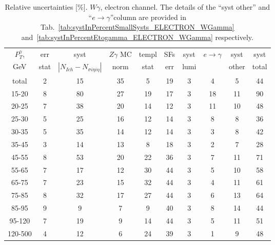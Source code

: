 \begin{table}[h]
  \scriptsize
  \begin{center}
  \caption{Relative uncertainties [\%]. $W\gamma$, electron channel. The details of the ``syst other'' and ``$e\rightarrow\gamma$''column are provided in Tab.~\ref{tab:systInPercentSmallSysts_ELECTRON_WGamma} and~\ref{tab:systInPercentEtogamma_ELECTRON_WGamma} respectively. }
   \begin{tabular}{|c|c|c|c|c|c|c|c|c|c|}
    $P_T^{\gamma}$,  & err & syst & $Z\gamma$ MC & templ & SFs & syst & $e\rightarrow\gamma$ & syst & syst\\
    GeV  & stat & $|N_{Ich}-N_{\sigma{i\eta i\eta}}|$ & norm & stat & err & lumi &  & other & total\\ \hline
    total  & 2 & 15 & 35 & 5 & 19 & 3 & 4 & 5 & 44 \\ \hline
    15-20 & 8 & 80 & 27 & 19 & 17 & 3 & 18 & 11 & 90 \\ \hline
    20-25 & 7 & 38 & 20 & 14 & 12 & 3 & 11 & 10 & 48 \\ \hline
    25-30 & 5 & 25 & 16 & 12 & 14 & 3 & 8 & 8 & 36 \\ \hline
    30-35 & 5 & 35 & 14 & 12 & 14 & 3 & 3 & 8 & 42 \\ \hline
    35-45 & 3 & 14 & 13 & 8 & 18 & 3 & 2 & 7 & 28 \\ \hline
    45-55 & 8 & 53 & 20 & 22 & 36 & 3 & 7 & 11 & 71 \\ \hline
    55-65 & 7 & 17 & 12 & 30 & 44 & 3 & 5 & 10 & 58 \\ \hline
    65-75 & 7 & 23 & 15 & 32 & 44 & 3 & 4 & 11 & 61 \\ \hline
    75-85 & 8 & 32 & 17 & 27 & 44 & 3 & 6 & 13 & 64 \\ \hline
    85-95 & 9 & 9 & 7 & 9 & 40 & 3 & 8 & 14 & 44 \\ \hline
    95-120 & 7 & 19 & 9 & 14 & 44 & 3 & 5 & 11 & 51 \\ \hline
    120-500 & 4 & 12 & 6 & 24 & 39 & 3 & 1 & 9 & 48 \\ \hline
  \end{tabular}
  \label{tab:systInPercent_ELECTRON_WGamma}
  \end{center}
\end{table}


